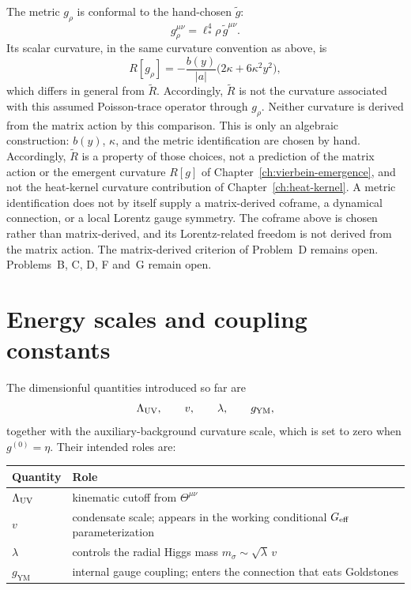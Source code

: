 \begin{remark}
The metric \(g_\rho\) is conformal to the hand-chosen
\(\tilde g\):
\[
  g_\rho^{\mu\nu}
  =\ell_*^4\rho\,\tilde g^{\mu\nu}.
\]
Its scalar curvature, in the same curvature convention as above, is
\[
  R[g_\rho]
  =-\frac{b(y)}{|a|}
       \bigl(2\kappa+6\kappa^2y^2\bigr),
\]
which differs in general from \(\tilde R\). Accordingly, \(\tilde R\)
is not the curvature associated with this assumed
Poisson-trace operator through \(g_\rho\). Neither curvature is
derived from the matrix action by this comparison.
This is only an algebraic construction: \(b(y)\), \(\kappa\), and
the metric identification are chosen by hand. Accordingly,
\(\tilde R\) is a property of those choices, not a prediction of the
matrix action or the emergent curvature
\(R[g]\) of Chapter~\ref{ch:vierbein-emergence}, and not the
heat-kernel curvature contribution of Chapter~\ref{ch:heat-kernel}.
A metric identification does not by itself supply a matrix-derived
coframe, a dynamical connection, or a local Lorentz gauge symmetry.
The coframe above is chosen rather than matrix-derived, and its
Lorentz-related freedom is not derived from the matrix action. The matrix-derived criterion
of Problem~D remains open. Problems~B, C, D, F and~G remain open.
\end{remark}

\section{Energy scales and coupling constants}
\label{sec:ch3-scales}

The dimensionful quantities introduced so far are
\begin{equation}
  \label{eq:scales}
  \Lambda_{\mathrm{UV}},\qquad v,\qquad \lambda,\qquad g_{\mathrm{YM}},
\end{equation}
together with the auxiliary-background curvature scale, which is set
to zero when \(g^{(0)}=\eta\). Their intended roles are:

\begin{center}
{\setlength{\tabcolsep}{3pt}
\begin{tabular}{@{}ll@{}}
\toprule
Quantity & Role \\
\midrule
\(\Lambda_{\mathrm{UV}}\) & kinematic cutoff from \(\Theta^{\mu\nu}\) \\
\(v\) & condensate scale; appears in the working conditional \(G_{\mathrm{eff}}\) parameterization \\
\(\lambda\) & controls the radial Higgs mass \(m_\sigma\sim\sqrt{\lambda}\,v\) \\
\(g_{\mathrm{YM}}\) & internal gauge coupling; enters the connection
                     that eats Goldstones \\
\bottomrule
\end{tabular}
}
\end{center}

